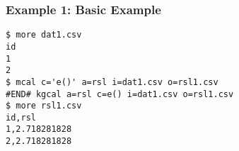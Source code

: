 \subsubsection*{Example 1: Basic Example}



\begin{Verbatim}[baselinestretch=0.7,frame=single]
$ more dat1.csv
id
1
2
$ mcal c='e()' a=rsl i=dat1.csv o=rsl1.csv
#END# kgcal a=rsl c=e() i=dat1.csv o=rsl1.csv
$ more rsl1.csv
id,rsl
1,2.718281828
2,2.718281828
\end{Verbatim}
